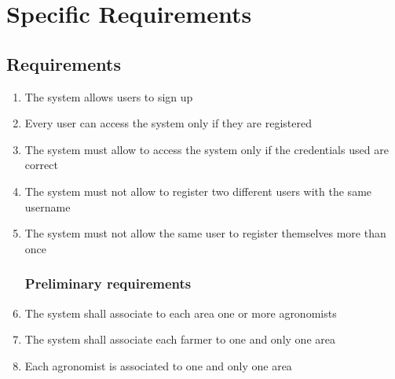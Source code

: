 \documentclass[10pt]{report}
\begin{document}
\chapter{Specific Requirements}
\section{Requirements}
    \begin{enumerate} [label=(R\arabic*), font=\itshape]
        \subsection*{Login}
        \item The system allows users to sign up
        \item Every user can access the system only if they are registered
        \item The system must allow to access the system only if the credentials used are correct
        \item The system must not allow to register two different users with the same username
        \item The system must not allow the same user to register themselves more than once
        \subsection*{Preliminary requirements}
        \item The system shall associate to each area one or more agronomists
        \item The system shall associate each farmer to one and only one area
        \item Each agronomist is associated to one and only one area

\end{enumerate}
\end{document}
